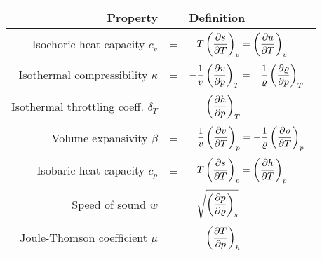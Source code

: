 \begin{tabularx}{\linewidth}{rcl}
\toprule
Property& &\quad Definition \\
\midrule
%
Isochoric heat capacity $c_v$ &=& $\phantom{-}T\left( \dfrac{\partial s}{\partial T} \right)_{v} = \left( \dfrac{\partial u}{\partial T} \right)_{v}^{\phantom{-1}}$ \\[15pt]
%
Isothermal compressibility $\kappa$ &=& $-\dfrac{1}{v}
\left( \dfrac{\partial v}{\partial p} \right)_{T} = \phantom{-}\dfrac{1}{\varrho} \left( \dfrac{\partial \varrho}{\partial p} \right)_{T}^{\phantom{-1}}$ \\[15pt]
%
Isothermal throttling coeff. $\delta_T$ &=& $\phantom{-\dfrac{1}{v}}
\der{h}{p}{T}^{\phantom{-1}}$ \\[15pt]
%
Volume expansivity $\beta$ &=& $\phantom{-}\dfrac{1}{v}
\left( \dfrac{\partial v}{\partial T} \right)_{p} = -\dfrac{1}{\varrho} \left( \dfrac{\partial \varrho}{\partial T} \right)_{p}^{\phantom{-1}}$ \\[15pt]
%
Isobaric heat capacity $c_p$ &=& $\phantom{-}T\left( \dfrac{\partial s}{\partial T} \right)_{p} = \left( \dfrac{\partial h}{\partial T} \right)_{p}^{\phantom{-1}}$ \\[15pt]
%
Speed of sound $w$ &=& $\phantom{-}\sqrt{\left( \dfrac{\partial p}{\partial \varrho} \right)_{s}}$ \\[15pt]
%
Joule-Thomson coefficient $\mu$ &=& $\phantom{-\dfrac{1}{v}}
\der{T}{p}{h}^{\phantom{-1}}$ \\[10pt]
%
\bottomrule
\end{tabularx}%
